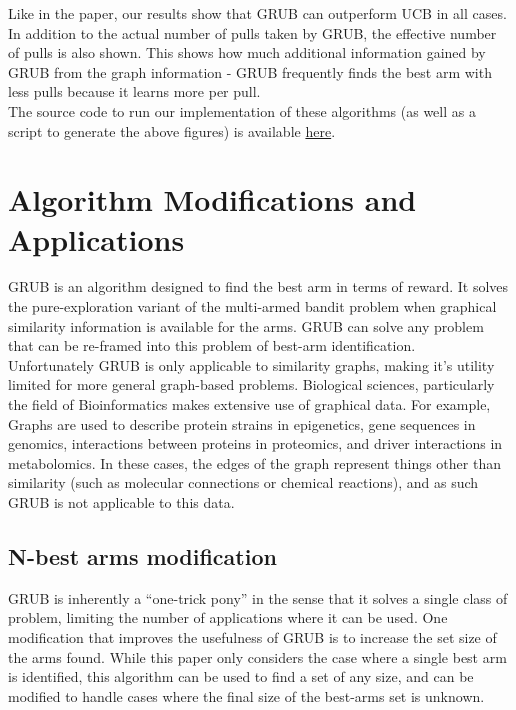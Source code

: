 \documentclass{article}[12pt]
\begin{document}
Like in the paper, our results show that GRUB can outperform UCB in all cases.
In addition to the actual number of pulls taken by GRUB, the effective number of pulls is also shown.
This shows how much additional information gained by GRUB from the graph information -
GRUB frequently finds the best arm with less pulls because it learns more per pull. \\


The source code to run our implementation of these algorithms (as well as a script to generate the above figures)
is available \href{https://github.com/sstalley/RPE_GRUB}{here}. \\




\pagebreak

\section{Algorithm Modifications and Applications}

GRUB is an algorithm designed to find the best arm in terms of reward.
It solves the pure-exploration variant of the multi-armed bandit problem when graphical similarity information is available for the arms.
GRUB can solve any problem that can be re-framed into this problem of best-arm identification. \\

Unfortunately GRUB is only applicable to similarity graphs, making it’s utility limited for more general graph-based problems.
Biological sciences, particularly the field of Bioinformatics makes extensive use of graphical data.
For example, Graphs are used to describe protein strains in epigenetics, gene sequences in genomics, interactions between proteins in proteomics, and driver interactions in metabolomics.
In these cases, the edges of the graph represent things other than similarity (such as molecular connections or chemical reactions), and as such GRUB is not applicable to this data.

\subsection{N-best arms modification}

GRUB is inherently a ``one-trick pony'' in the sense that it solves a single class of problem, limiting the number of applications where it can be used.
One modification that improves the usefulness of GRUB is to increase the set size of the arms found.
While this paper only considers the case where a single best arm is identified, this algorithm can be used to find a set of any size,
and can be modified to handle cases where the final size of the best-arms set is unknown. \\
\end{document}
